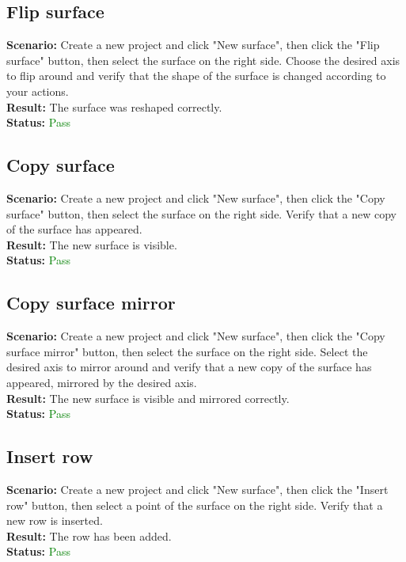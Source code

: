 \documentclass[a4paper, 11pt, article]{report}
\begin{document}
\subsection{Flip surface}

\noindent \textbf{Scenario:} Create a new project and click "New surface", then click the "Flip surface" button, then select the surface on the right side. Choose the desired axis to flip around and verify that the shape of the surface is changed according to your actions.
\\
\noindent \textbf{Result:} The surface was reshaped correctly.
\\
\noindent \textbf{Status:} \textcolor{green}{Pass}

\subsection{Copy surface}

\noindent \textbf{Scenario:} Create a new project and click "New surface", then click the "Copy surface" button, then select the surface on the right side. Verify that a new copy of the surface has appeared.
\\
\noindent \textbf{Result:} The new surface is visible.
\\
\noindent \textbf{Status:} \textcolor{green}{Pass}

\subsection{Copy surface mirror}

\noindent \textbf{Scenario:} Create a new project and click "New surface", then click the "Copy surface mirror" button, then select the surface on the right side. Select the desired axis to mirror around and verify that a new copy of the surface has appeared, mirrored by the desired axis.
\\
\noindent \textbf{Result:} The new surface is visible and mirrored correctly.
\\
\noindent \textbf{Status:} \textcolor{green}{Pass}

\subsection{Insert row}

\noindent \textbf{Scenario:} Create a new project and click "New surface", then click the "Insert row" button, then select a point of the surface on the right side. Verify that a new row is inserted.
\\
\noindent \textbf{Result:} The row has been added.
\\
\noindent \textbf{Status:} \textcolor{green}{Pass}
\end{document}
